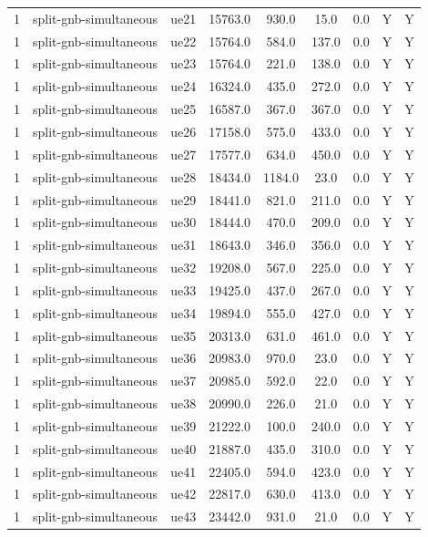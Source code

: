 \begin{table}[ht]
\begin{tabular}{|c|c|c|c|c|c|c|c|c|}
1 & split-gnb-simultaneous & ue21 & 15763.0 & 930.0 & 15.0 & 0.0 & Y & Y \\
1 & split-gnb-simultaneous & ue22 & 15764.0 & 584.0 & 137.0 & 0.0 & Y & Y \\
1 & split-gnb-simultaneous & ue23 & 15764.0 & 221.0 & 138.0 & 0.0 & Y & Y \\
1 & split-gnb-simultaneous & ue24 & 16324.0 & 435.0 & 272.0 & 0.0 & Y & Y \\
1 & split-gnb-simultaneous & ue25 & 16587.0 & 367.0 & 367.0 & 0.0 & Y & Y \\
1 & split-gnb-simultaneous & ue26 & 17158.0 & 575.0 & 433.0 & 0.0 & Y & Y \\
1 & split-gnb-simultaneous & ue27 & 17577.0 & 634.0 & 450.0 & 0.0 & Y & Y \\
1 & split-gnb-simultaneous & ue28 & 18434.0 & 1184.0 & 23.0 & 0.0 & Y & Y \\
1 & split-gnb-simultaneous & ue29 & 18441.0 & 821.0 & 211.0 & 0.0 & Y & Y \\
1 & split-gnb-simultaneous & ue30 & 18444.0 & 470.0 & 209.0 & 0.0 & Y & Y \\
1 & split-gnb-simultaneous & ue31 & 18643.0 & 346.0 & 356.0 & 0.0 & Y & Y \\
1 & split-gnb-simultaneous & ue32 & 19208.0 & 567.0 & 225.0 & 0.0 & Y & Y \\
1 & split-gnb-simultaneous & ue33 & 19425.0 & 437.0 & 267.0 & 0.0 & Y & Y \\
1 & split-gnb-simultaneous & ue34 & 19894.0 & 555.0 & 427.0 & 0.0 & Y & Y \\
1 & split-gnb-simultaneous & ue35 & 20313.0 & 631.0 & 461.0 & 0.0 & Y & Y \\
1 & split-gnb-simultaneous & ue36 & 20983.0 & 970.0 & 23.0 & 0.0 & Y & Y \\
1 & split-gnb-simultaneous & ue37 & 20985.0 & 592.0 & 22.0 & 0.0 & Y & Y \\
1 & split-gnb-simultaneous & ue38 & 20990.0 & 226.0 & 21.0 & 0.0 & Y & Y \\
1 & split-gnb-simultaneous & ue39 & 21222.0 & 100.0 & 240.0 & 0.0 & Y & Y \\
1 & split-gnb-simultaneous & ue40 & 21887.0 & 435.0 & 310.0 & 0.0 & Y & Y \\
1 & split-gnb-simultaneous & ue41 & 22405.0 & 594.0 & 423.0 & 0.0 & Y & Y \\
1 & split-gnb-simultaneous & ue42 & 22817.0 & 630.0 & 413.0 & 0.0 & Y & Y \\
1 & split-gnb-simultaneous & ue43 & 23442.0 & 931.0 & 21.0 & 0.0 & Y & Y \\

\end{tabular}
\end{table}
